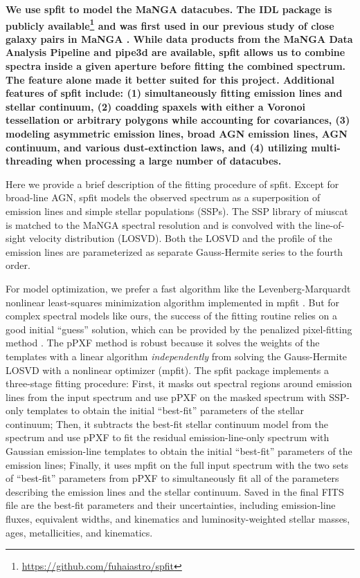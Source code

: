 \documentclass[iop,revtex4,twocolumn,apj,numberedappendix,appendixfloats]{emulateapj}
\begin{document}
{\bf 
We use {\sc spfit} to model the MaNGA datacubes. The IDL package is publicly available\footnote{\url{https://github.com/fuhaiastro/spfit}} and was first used in our previous study of close galaxy pairs in MaNGA . While data products from the MaNGA Data Analysis Pipeline \citep[DAP;][]{Belfiore:2019} and {\sc pipe3d} \citep{Sanchez:2016a, Sanchez:2016b} are available, {\sc spfit} allows us to combine spectra inside a given aperture before fitting the combined spectrum. The feature alone made it better suited for this project. Additional features of {\sc spfit} include: (1) simultaneously fitting emission lines and stellar continuum, (2) coadding spaxels with either a Voronoi tessellation or arbitrary polygons while accounting for covariances, (3) modeling asymmetric emission lines, broad AGN emission lines, AGN continuum, and various dust-extinction laws, and (4) utilizing multi-threading when processing a large number of datacubes.

Here we provide a brief description of the fitting procedure of {\sc spfit}. Except for broad-line AGN, {\sc spfit} models the observed spectrum as a superposition of emission lines and simple stellar populations (SSPs). The SSP library of {\sc miuscat} \citep{Vazdekis:2012} is matched to the MaNGA spectral resolution and is convolved with the line-of-sight velocity distribution (LOSVD). Both the LOSVD and the profile of the emission lines are parameterized as separate Gauss-Hermite series \citep{van-der-Marel:1993} to the fourth order.

For model optimization, we prefer a fast algorithm like the Levenberg-Marquardt nonlinear least-squares minimization algorithm implemented in {\sc mpfit} \citep{Markwardt:2009}. But for complex spectral models like ours, the success of the fitting routine relies on a good initial ``guess'' solution, which can be provided by the penalized pixel-fitting method \citep[pPXF;][]{Cappellari:2017}. The pPXF method is robust because it solves the weights of the templates with a linear algorithm \citep{Lawson:1974} {\it independently} from solving the Gauss-Hermite LOSVD with a nonlinear optimizer ({\sc mpfit}). The {\sc spfit} package implements a three-stage fitting procedure: First, it masks out spectral regions around emission lines from the input spectrum and use pPXF on the masked spectrum with SSP-only templates to obtain the initial ``best-fit'' parameters of the stellar continuum; Then, it subtracts the best-fit stellar continuum model from the spectrum and use pPXF to fit the residual emission-line-only spectrum with Gaussian emission-line templates to obtain the initial ``best-fit'' parameters of the emission lines; Finally, it uses {\sc mpfit} on the full input spectrum with the two sets of ``best-fit'' parameters from pPXF to simultaneously fit all of the parameters describing the emission lines and the stellar continuum. Saved in the final FITS file are the best-fit parameters and their uncertainties, including emission-line fluxes, equivalent widths, and kinematics and luminosity-weighted stellar masses, ages, metallicities, and kinematics. 
}
\end{document}
